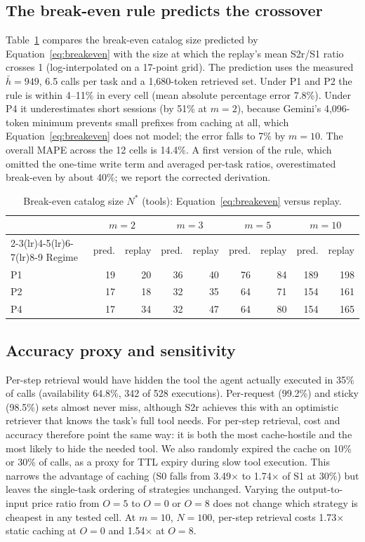 \documentclass[11pt]{article}
\begin{document}
\subsection{The break-even rule predicts the crossover}
Table~\ref{tab:breakeven} compares the break-even catalog size predicted by Equation~\ref{eq:breakeven} with the size at which the replay's mean S2r/S1 ratio crosses 1 (log-interpolated on a 17-point grid). The prediction uses the measured $\bar h{=}949$, 6.5 calls per task and a 1,680-token retrieved set. Under P1 and P2 the rule is within 4--11\% in every cell (mean absolute percentage error 7.8\%). Under P4 it underestimates short sessions (by 51\% at $m{=}2$), because Gemini's 4,096-token minimum prevents small prefixes from caching at all, which Equation~\ref{eq:breakeven} does not model; the error falls to 7\% by $m{=}10$. The overall MAPE across the 12 cells is 14.4\%. A first version of the rule, which omitted the one-time write term and averaged per-task ratios, overestimated break-even by about 40\%; we report the corrected derivation.

\begin{table}[t]
\centering\small
\caption{Break-even catalog size $N^*$ (tools): Equation~\ref{eq:breakeven} versus replay.}
\label{tab:breakeven}
\begin{tabular}{@{}lrrrrrrrr@{}}
\toprule
 & \multicolumn{2}{c}{$m{=}2$} & \multicolumn{2}{c}{$m{=}3$} & \multicolumn{2}{c}{$m{=}5$} & \multicolumn{2}{c}{$m{=}10$} \\
\cmidrule(lr){2-3}\cmidrule(lr){4-5}\cmidrule(lr){6-7}\cmidrule(lr){8-9}
Regime & pred. & replay & pred. & replay & pred. & replay & pred. & replay \\
\midrule
P1 & 19 & 20 & 36 & 40 & 76 & 84 & 189 & 198 \\
P2 & 17 & 18 & 32 & 35 & 64 & 71 & 154 & 161 \\
P4 & 17 & 34 & 32 & 47 & 64 & 80 & 154 & 165 \\
\bottomrule
\end{tabular}
\end{table}

\subsection{Accuracy proxy and sensitivity}
Per-step retrieval would have hidden the tool the agent actually executed in 35\% of calls (availability 64.8\%, 342 of 528 executions). Per-request (99.2\%) and sticky (98.5\%) sets almost never miss, although S2r achieves this with an optimistic retriever that knows the task's full tool needs. For per-step retrieval, cost and accuracy therefore point the same way: it is both the most cache-hostile and the most likely to hide the needed tool. We also randomly expired the cache on 10\% or 30\% of calls, as a proxy for TTL expiry during slow tool execution. This narrows the advantage of caching (S0 falls from 3.49$\times$ to 1.74$\times$ of S1 at 30\%) but leaves the single-task ordering of strategies unchanged. Varying the output-to-input price ratio from $O{=}5$ to $O{=}0$ or $O{=}8$ does not change which strategy is cheapest in any tested cell. At $m{=}10$, $N{=}100$, per-step retrieval costs 1.73$\times$ static caching at $O{=}0$ and 1.54$\times$ at $O{=}8$.
\end{document}
